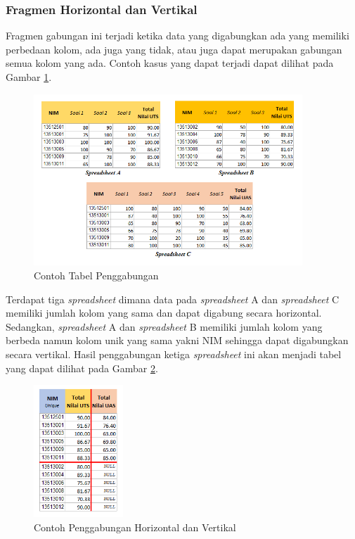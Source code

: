 	\subsubsection{Fragmen Horizontal dan Vertikal}
	Fragmen gabungan ini terjadi ketika data yang digabungkan ada yang memiliki perbedaan kolom, ada juga yang tidak, atau juga dapat merupakan gabungan semua kolom yang ada. Contoh kasus yang dapat terjadi dapat dilihat pada Gambar \ref{BothTableMerge}.

	\begin{figure}[htb]
	    \centering
	    \includegraphics[width=0.9\textwidth]{resources/chapter-3-both-merge.png}
	    \caption{Contoh Tabel Penggabungan}
		\label{BothTableMerge}
	\end{figure}

	Terdapat tiga \textit{spreadsheet} dimana data pada \textit{spreadsheet} A dan \textit{spreadsheet} C memiliki jumlah kolom yang sama dan dapat digabung secara horizontal. Sedangkan, \textit{spreadsheet} A dan \textit{spreadsheet} B memiliki jumlah kolom yang berbeda namun kolom unik yang sama yakni NIM sehingga dapat digabungkan secara vertikal. Hasil penggabungan ketiga \textit{spreadsheet} ini akan menjadi tabel yang dapat dilihat pada Gambar \ref{BothMerge}.

	\begin{figure}[htb]
	    \centering
	    \includegraphics[width=0.3\textwidth]{resources/chapter-3-both-merge-db.png}
	    \caption{Contoh Penggabungan Horizontal dan Vertikal}
		\label{BothMerge}
	\end{figure}

